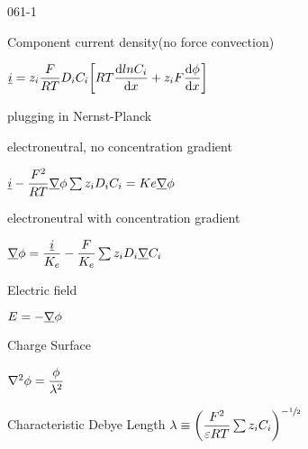 \begin{mitframe}{061-1}
\begin{listone}
\begin{listtwo}
\begin{listthree}
                 		\begin{listfour}
                        		\item Component current density(no force convection)
                                		\begin{listfive}
                                        		\item $\uline{\currentdensity}={z}_{\state}\dfrac{\force}{\gasconst\Temp}\pdiff\conc_{\state}\bigg[\gasconst\Temp\dfrac{\mathrm{d}ln\conc_{\state}}{\mathrm{d}\disp}+z_{\state}\force\dfrac{\mathrm{d}\eleccoeff}{\mathrm{d}\disp}\bigg]$
                                               \end{listfive}
                                  \item plugging in Nernst-Planck
                                  \item electroneutral, no concentration gradient
                                      		 \begin{listfive}
                                             		\item $\uline{\currentdensity}-\dfrac{\force^2}{\gasconst\Temp}\gradop\eleccoeff\sum\nolimits{z}_{\state}\pdiff\conc_{\state}=\dilfac{e}\gradop\eleccoeff$
                                               \end{listfive}
                        		\item electroneutral with concentration gradient
                                				\begin{listfive}
                                                		\item $\gradop\eleccoeff=\dfrac{\uline{\currentdensity}}{\dilfac_{\e}}-\dfrac{\force}{\dilfac_{\e}}\sum\nolimits{z}_{\state}\pdiff\gradop\conc_{\state}$
                                                        
                                                \end{listfive}
                        \end{listfour}   
                \end{listthree}
        \item Electric field
        		\begin{listthree}
                		\item $\elecfield=-\gradop\eleccoeff$
                \end{listthree}
        	\item Charge Surface
        		\begin{listthree}
                		\item $\nabla^2\eleccoeff=\dfrac{\eleccoeff}{\wavel^2}$
                        \begin{listfour}
                        		\item Characteristic Debye Length $\wavel\equiv\bigg(\dfrac{\force^2}{\varepsilon\gasconst\Temp}\sum\nolimits{z}_{\state}\conc_{\state}\bigg)^{-\sfrac{1}{2}}$
                                

\end{listfour}
\end{listthree}
\end{listtwo}
\end{listone}
\end{mitframe}
